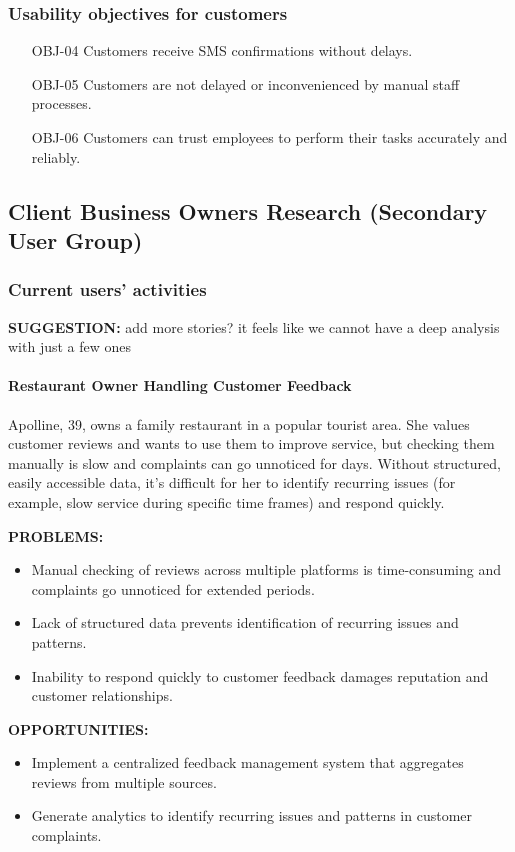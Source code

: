 \documentclass[]{VUMIFTemplateClass}
\newcommand{\suggestioncomment}[1]{%
    \definecolor{lime}{RGB}{50,205,50}%
    \begin{tcolorbox}[colback=lime!15, colframe=lime!60, arc=0pt, outer arc=0pt, boxrule=1pt, left=3pt, right=3pt, top=3pt, bottom=3pt]
        \textbf{\textcolor{lime!70!black}{SUGGESTION:}} #1
    \end{tcolorbox}%
}
\newcommand{\subsubsubsection}[1]{\paragraph{#1}}
\begin{document}

\subsubsection{Usability objectives for customers}
\begin{itemize}
    \item[OBJ-04] Customers receive SMS confirmations without delays.
    \item[OBJ-05] Customers are not delayed or inconvenienced by manual staff processes.
    \item[OBJ-06] Customers can trust employees to perform their tasks accurately and reliably.
\end{itemize}

\subsection{Client Business Owners Research (Secondary User Group)}

\subsubsection{Current users' activities}
\suggestioncomment{add more stories? it feels like we cannot have a deep analysis with just a few ones}

\subsubsubsection{Restaurant Owner Handling Customer Feedback}

Apolline, 39, owns a family restaurant in a popular tourist area. She values
customer reviews and wants to use them to improve service, but checking them
manually is slow and complaints can go unnoticed for days. Without structured,
easily accessible data, it’s difficult for her to identify recurring issues (for
example, slow service during specific time frames) and respond quickly.

\textbf{PROBLEMS:}
\begin{itemize}
    \item Manual checking of reviews across multiple platforms is time-consuming and complaints go unnoticed for extended periods.
    \item Lack of structured data prevents identification of recurring issues and patterns.
    \item Inability to respond quickly to customer feedback damages reputation and customer relationships.
\end{itemize}
\textbf{OPPORTUNITIES:}
\begin{itemize}
    \item Implement a centralized feedback management system that aggregates reviews from multiple sources.
    \item Generate analytics to identify recurring issues and patterns in customer complaints.
\end{itemize}
\end{document}
